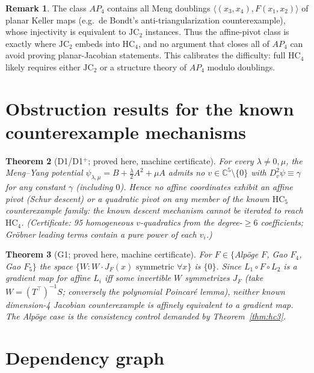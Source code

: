 \documentclass[11pt]{article}
\theoremstyle{plain}
\newtheorem{theorem}{Theorem}[section]
\theoremstyle{definition}
\newtheorem{remark}[theorem]{Remark}
\newcommand{\C}{\mathbb{C}}
\newcommand{\JC}{\mathrm{JC}}
\newcommand{\HC}{\mathrm{HC}}
\begin{document}
\begin{remark}
The class $AP_4$ contains all Meng doublings
$\langle(x_3,x_4),F(x_1,x_2)\rangle$ of planar Keller maps (e.g.\ de
Bondt's anti-triangularization counterexample), whose injectivity is
equivalent to $\JC_2$ instances. Thus the affine-pivot class is exactly
where $\JC_2$ embeds into $\HC_4$, and no argument that closes all of
$AP_4$ can avoid proving planar-Jacobian statements. This calibrates the
difficulty: full $\HC_4$ likely requires either $\JC_2$ or a structure
theory of $AP_4$ modulo doublings.
\end{remark}

\section{Obstruction results for the known counterexample mechanisms}

\begin{theorem}[D1/D1$^+$; proved here, machine certificate]\label{thm:d1}
For every $\lambda\ne0,\mu$, the Meng--Yang potential
$\psi_{\lambda,\mu}=B+\tfrac\lambda2A^2+\mu A$ admits no $v\in\C^5\setminus
\{0\}$ with $D_v^2\psi\equiv\gamma$ for any constant $\gamma$ (including
$0$). Hence no affine coordinates exhibit an affine pivot (Schur descent)
or a quadratic pivot on any member of the known $\HC_5$ counterexample
family: \emph{the known descent mechanism cannot be iterated to reach
$\HC_4$.} (Certificate: 95 homogeneous $v$-quadratics from the
degree-$\ge6$ coefficients; Gr\"obner leading terms contain a pure power of
each $v_i$.)
\end{theorem}

\begin{theorem}[G1; proved here, machine certificate]\label{thm:g1}
For $F\in\{$Alp\"oge $F$, Gao $F_4$, Gao $F_5\}$ the space $\{W:W\cdot
J_F(x)\text{ symmetric }\forall x\}$ is $\{0\}$. Since $L_1\circ F\circ
L_2$ is a gradient map for affine $L_i$ iff some invertible $W$
symmetrizes $J_F$ (take $W=(T^\top)^{-1}S$; conversely the polynomial
Poincar\'e lemma), \emph{neither known dimension-4 Jacobian counterexample
is affinely equivalent to a gradient map}. The Alp\"oge case is the
consistency control demanded by Theorem~\ref{thm:hc3}.
\end{theorem}

\section{Dependency graph}
\end{document}
